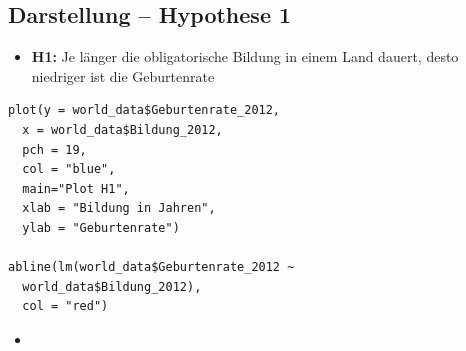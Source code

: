 \documentclass[aspectratio=169, journal, x11names, unknownkeysallowed, hyperref={colorlinks,
linkcolor = SS2,
urlcolor  = F3,
citecolor = F3,
anchorcolor = A4}, 12pt]{beamer}
\begin{document}
  \subsection{Darstellung -- Hypothese 1} 
  \begin{frame}[t, fragile]
    \begin{minipage}[t]{0.45\textwidth}
        \begin{itemize}
            \item[] \textbf{H1:} Je länger die obligatorische Bildung in einem Land dauert, desto niedriger ist die Geburtenrate
          \end{itemize}
\begin{lstlisting}
plot(y = world_data$Geburtenrate_2012, 
  x = world_data$Bildung_2012, 
  pch = 19, 
  col = "blue", 
  main="Plot H1", 
  xlab = "Bildung in Jahren", 
  ylab = "Geburtenrate")

abline(lm(world_data$Geburtenrate_2012 ~ 
  world_data$Bildung_2012), 
  col = "red")
\end{lstlisting} 
      \end{minipage}
      \begin{minipage}[t]{0.45\textwidth}
        \begin{itemize}
          \item[]
        \end{itemize}
      \end{minipage}
  \end{frame}
\end{document}
